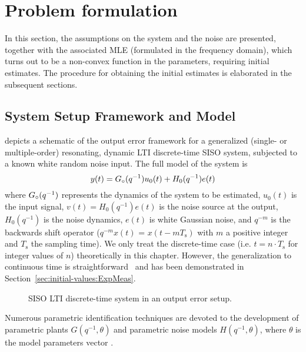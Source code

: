 \section{Problem formulation}\label{sec:initial-values:ProbForm}

In this section, the assumptions on the system and the noise are presented, together with the associated MLE (formulated in the frequency domain), which turns out to be a non-convex function in the parameters, requiring initial estimates. The procedure for obtaining the initial estimates is elaborated in the subsequent sections.

\subsection{System Setup Framework and Model}
 depicts a schematic of the output error framework for  a generalized (single- or multiple-order) resonating, dynamic \gls{LTI} discrete-time \gls{SISO} system, subjected to a known white random noise input. 
The full model of the system is
\begin{equation}
y(t)={G}_{\circ}(q^{-1})u_0(t)+H_0(q^{-1})e(t)
\label{eq:initial-values:OE:TD}
\end{equation}
where ${G}_{\circ}(q^{-1})$ represents the dynamics of the system to be estimated, $u_0(t)$ is the input signal, $v(t)= H_0(q^{-1})e(t)$ is the noise source at the output, $H_0(q^{-1})$ is the noise dynamics, 
$e(t)$ is white Gaussian noise, and $q^{-m}$ is the backwards shift operator ($q^{-m}x(t)$ = $x(t-mT_{\mathrm{s}})$  with $m$ a positive integer and $T_{\mathrm{s}}$ the sampling time).
We only treat the discrete-time case (i.e. $t = n \cdot T_{\mathrm{s}}$ for integer values of $n$) theoretically in this chapter.
However, the generalization to continuous time is straightforward~\citep[Chapter 6]{Pintelon2012} and has been demonstrated in Section~\ref{sec:initial-values:ExpMeas}.

\begin{figure}[tbh]
\centering

\caption[Output-error set-up.]{SISO LTI discrete-time system in an output error setup.}
\label{fig:oesetup}
\end{figure}

Numerous parametric identification techniques are devoted to the development of parametric plants $G(q^{-1},\theta)$ and parametric noise models  $H(q^{-1},\theta)$, where  $\theta$ is the model parameters vector  \citep{Ljung1999,Soderstrom1989}.

